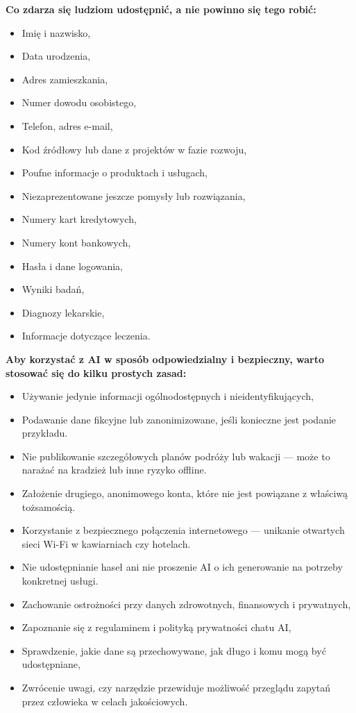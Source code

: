 \textbf{Co zdarza się ludziom udostępnić, a nie powinno się tego robić:}

\begin{itemize}
  \item Imię i nazwisko,
  \item Data urodzenia,
  \item Adres zamieszkania,
  \item Numer dowodu osobistego,
  \item Telefon, adres e-mail,
  \item Kod źródłowy lub dane z projektów w fazie rozwoju,
  \item Poufne informacje o produktach i usługach,
  \item Niezaprezentowane jeszcze pomysły lub rozwiązania,
  \item Numery kart kredytowych,
  \item Numery kont bankowych,
  \item Hasła i dane logowania,
  \item Wyniki badań,
  \item Diagnozy lekarskie,
  \item Informacje dotyczące leczenia.
\end{itemize}

\textbf{Aby korzystać z AI w sposób odpowiedzialny i bezpieczny, warto stosować się do kilku prostych zasad:}

\begin{itemize}
  \item Używanie jedynie informacji ogólnodostępnych i nieidentyfikujących,
  \item Podawanie dane fikcyjne lub zanonimizowane, jeśli konieczne jest podanie przykładu.
  \item Nie publikowanie szczegółowych planów podróży lub wakacji — może to narażać na kradzież lub inne ryzyko offline.
  \item Założenie drugiego, anonimowego konta, które nie jest powiązane z właściwą tożsamością.
  \item Korzystanie z bezpiecznego połączenia internetowego — unikanie otwartych sieci Wi-Fi w kawiarniach czy hotelach.
  \item Nie udostępnianie haseł ani nie proszenie AI o ich generowanie na potrzeby konkretnej usługi.
  \item Zachowanie ostrożności przy danych zdrowotnych, finansowych i prywatnych,
  \item Zapoznanie się z regulaminem i polityką prywatności chatu AI,
  \item Sprawdzenie, jakie dane są przechowywane, jak długo i komu mogą być udostępniane,
  \item Zwrócenie uwagi, czy narzędzie przewiduje możliwość przeglądu zapytań przez człowieka w celach jakościowych.
\end{itemize}

